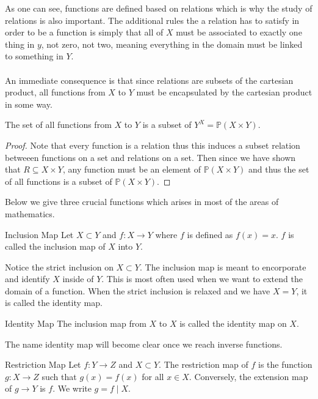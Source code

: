 \documentclass[a4paper]{article}
\begin{document}
As one can see, functions are defined based on relations which is why the study of relations is also important. The additional rules the a relation has to satisfy in order to be a function is simply that all of $X$ must be associated to exactly one thing in $y$, not zero, not two, meaning everything in the domain must be linked to something in $Y$. \\~\\

An immediate consequence is that since relations are subsets of the cartesian product, all functions from $X$ to $Y$ must be encapsulated by the cartesian product in some way. 

\begin{prp}{}{} The set of all functions from $X$ to $Y$ is a subset of $Y^X=\mathbb{P}(X\times Y)$. \tcbline
\begin{proof}{}{} Note that every function is a relation thus this induces a subset relation betweeen functions on a set and relations on a set. Then since we have shown that $R\subseteq X\times Y$, any function must be an element of $\mathbb{P}(X\times Y)$ and thus the set of all functions is a subset of $\mathbb{P}(X\times Y)$. 
\end{proof}
\end{prp}

Below we give three crucial functions which arises in most of the areas of mathematics. 

\begin{defn}{Inclusion Map}{} Let $X\subset Y$ and $f:X\to Y$ where $f$ is defined as $f(x)=x$. $f$ is called the inclusion map of $X$ into $Y$. 
\end{defn}

Notice the strict inclusion on $X\subset Y$. The inclusion map is meant to encorporate and identify $X$ inside of $Y$. This is most often used when we want to extend the domain of a function. When the strict inclusion is relaxed and we have $X=Y$, it is called the identity map. 

\begin{defn}{Identity Map}{} The inclusion map from $X$ to $X$ is called the identity map on $X$. 
\end{defn}

The name identity map will become clear once we reach inverse functions. 

\begin{defn}{Restriction Map}{} Let $f:Y\to Z$ and $X\subset Y$. The restriction map of $f$ is the function $g:X\to Z$ such that $g(x)=f(x)$ for all $x\in X$. Conversely, the extension map of $g\to Y$ is $f$. We write $g=f\;|\;X$. 
\end{defn}
\end{document}
